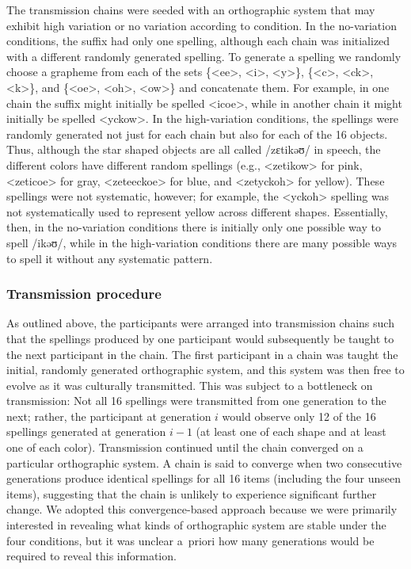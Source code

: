 \documentclass[doc,biblatex]{apa7}
\begin{document}
The transmission chains were seeded with an orthographic system that may exhibit high variation or no variation according to condition. In the no-variation conditions, the suffix had only one spelling, although each chain was initialized with a different randomly generated spelling. To generate a spelling we randomly choose a grapheme from each of the sets \{<ee>, <i>, <y>\}, \{<c>, <ck>, <k>\}, and \{<oe>, <oh>, <ow>\} and concatenate them. For example, in one chain the suffix might initially be spelled <icoe>, while in another chain it might initially be spelled <yckow>. In the high-variation conditions, the spellings were randomly generated not just for each chain but also for each of the 16 objects. Thus, although the star shaped objects are all called /zɛtikəʊ/ in speech, the different colors have different random spellings (e.g., <zetikow> for pink, <zeticoe> for gray, <zeteeckoe> for blue, and <zetyckoh> for yellow). These spellings were not systematic, however; for example, the <yckoh> spelling was not systematically used to represent yellow across different shapes. Essentially, then, in the no-variation conditions there is initially only one possible way to spell /ikəʊ/, while in the high-variation conditions there are many possible ways to spell it without any systematic pattern.

\subsubsection{Transmission procedure}

As outlined above, the participants were arranged into transmission chains such that the spellings produced by one participant would subsequently be taught to the next participant in the chain. The first participant in a chain was taught the initial, randomly generated orthographic system, and this system was then free to evolve as it was culturally transmitted. This was subject to a bottleneck on transmission: Not all 16 spellings were transmitted from one generation to the next; rather, the participant at generation $i$ would observe only 12 of the 16 spellings generated at generation $i-1$ (at least one of each shape and at least one of each color). Transmission continued until the chain converged on a particular orthographic system. A chain is said to converge when two consecutive generations produce identical spellings for all 16 items (including the four unseen items), suggesting that the chain is unlikely to experience significant further change. We adopted this convergence-based approach because we were primarily interested in revealing what kinds of orthographic system are stable under the four conditions, but it was unclear a~priori how many generations would be required to reveal this information.
\end{document}
